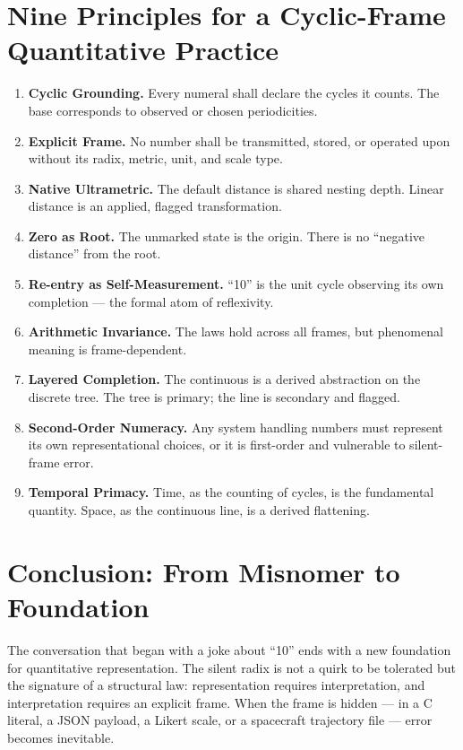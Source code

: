 \documentclass[12pt,a4paper]{article}
\theoremstyle{definition}
\theoremstyle{remark}
\begin{document}
\section{Nine Principles for a Cyclic-Frame Quantitative Practice}

\begin{enumerate}[nosep]
  \item \textbf{Cyclic Grounding.} Every numeral shall declare the cycles it counts.
        The base corresponds to observed or chosen periodicities.
  \item \textbf{Explicit Frame.} No number shall be transmitted, stored, or operated
        upon without its radix, metric, unit, and scale type.
  \item \textbf{Native Ultrametric.} The default distance is shared nesting depth.
        Linear distance is an applied, flagged transformation.
  \item \textbf{Zero as Root.} The unmarked state is the origin. There is no
        ``negative distance'' from the root.
  \item \textbf{Re-entry as Self-Measurement.} ``10'' is the unit cycle observing
        its own completion --- the formal atom of reflexivity.
  \item \textbf{Arithmetic Invariance.} The laws hold across all frames, but
        phenomenal meaning is frame-dependent.
  \item \textbf{Layered Completion.} The continuous is a derived abstraction on the
        discrete tree. The tree is primary; the line is secondary and flagged.
  \item \textbf{Second-Order Numeracy.} Any system handling numbers must represent
        its own representational choices, or it is first-order and vulnerable to
        silent-frame error.
  \item \textbf{Temporal Primacy.} Time, as the counting of cycles, is the
        fundamental quantity. Space, as the continuous line, is a derived
        flattening.
\end{enumerate}

\section{Conclusion: From Misnomer to Foundation}

The conversation that began with a joke about ``10'' ends with a new foundation for
quantitative representation. The silent radix is not a quirk to be tolerated but
the signature of a structural law: representation requires interpretation, and
interpretation requires an explicit frame. When the frame is hidden --- in a C
literal, a JSON payload, a Likert scale, or a spacecraft trajectory file --- error
becomes inevitable.
\end{document}
